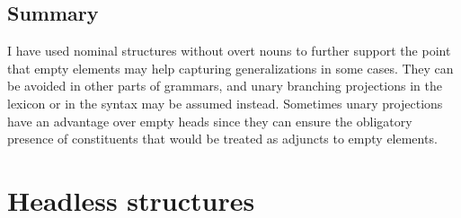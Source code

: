\documentclass[output=paper
  ,nobabel
  ,draftmode
  ,uniformtopskip %
  ,colorlinks, citecolor=brown
]{langscibook}
\begin{document}
\subsection{Summary}

I have used nominal structures without overt nouns to further support the point that empty elements may
help capturing generalizations in some cases. They can be avoided in other parts of grammars, and
unary branching projections in the lexicon or in the syntax may be assumed instead. Sometimes unary
projections have an advantage over empty heads since they can ensure the obligatory presence of
constituents that would be treated as adjuncts to empty elements.




\section{Headless structures}
\label{sec-kopflos}
\end{document}

